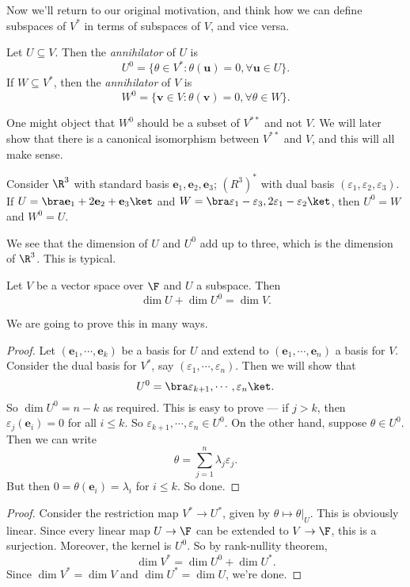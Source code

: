 \documentclass[a4paper]{article}
\begin{document}
Now we'll return to our original motivation, and think how we can define subspaces of $V^*$ in terms of subspaces of $V$, and vice versa.

\begin{defi}[Annihilator]
  Let $U\subseteq V$. Then the \emph{annihilator} of $U$ is
  \[
    U^0 = \{\theta\in V^* : \theta(\mathbf{u}) = 0, \forall \mathbf{u}\in U\}.
  \]
  If $W \subseteq V^*$, then the \emph{annihilator} of $V$ is
  \[
    W^0 = \{\mathbf{v}\in V: \theta(\mathbf{v}) = 0,\forall \theta \in W\}.
  \]
\end{defi}
One might object that $W^0$ should be a subset of $V^{**}$ and not $V$. We will later show that there is a canonical isomorphism between $V^{**}$ and $V$, and this will all make sense.

\begin{eg}
  Consider $\R^3$ with standard basis $\mathbf{e}_1, \mathbf{e}_2, \mathbf{e}_3$; $(R^3)^*$ with dual basis $(\varepsilon_1, \varepsilon_2, \varepsilon_3)$. If $U = \bra \mathbf{e}_1 + 2\mathbf{e}_2 + \mathbf{e}_3\ket$ and $W = \bra \varepsilon_1 - \varepsilon_3, 2\varepsilon_1 - \varepsilon_2\ket $, then $U^0 = W$ and $W^0 = U$.
\end{eg}
We see that the dimension of $U$ and $U^0$ add up to three, which is the dimension of $\R^3$. This is typical.

\begin{prop}
  Let $V$ be a vector space over $\F$ and $U$ a subspace. Then
  \[
    \dim U + \dim U^0 = \dim V.
  \]
\end{prop}
We are going to prove this in many ways.
\begin{proof}
  Let $(\mathbf{e}_1, \cdots, \mathbf{e}_k)$ be a basis for $U$ and extend to $(\mathbf{e}_1, \cdots, \mathbf{e}_n)$ a basis for $V$. Consider the dual basis for $V^*$, say $(\varepsilon_1, \cdots, \varepsilon_n)$. Then we will show that
  \[
    U^0 = \bra \varepsilon_{k + 1}, \cdots, \varepsilon_{n}\ket.
  \]
  So $\dim U^0 = n - k$ as required. This is easy to prove --- if $j > k$, then $\varepsilon_j(\mathbf{e}_i) = 0$ for all $ i \leq k$. So $\varepsilon_{k + 1}, \cdots, \varepsilon_n \in U^0$. On the other hand, suppose $\theta \in U^0$. Then we can write
  \[
    \theta = \sum_{j = 1}^n \lambda_j \varepsilon_j.
  \]
  But then $0 = \theta (\mathbf{e}_i) = \lambda_i$ for $i \leq k$. So done.
\end{proof}

\begin{proof}
  Consider the restriction map $V^* \to U^*$, given by $\theta \mapsto \theta|_U$. This is obviously linear. Since every linear map $U \to \F$ can be extended to $V\to \F$, this is a surjection. Moreover, the kernel is $U^0$. So by rank-nullity theorem,
  \[
    \dim V^* = \dim U^0 + \dim U^*.
  \]
  Since $\dim V^* = \dim V$ and $\dim U^* = \dim U$, we're done.
\end{proof}
\end{document}
